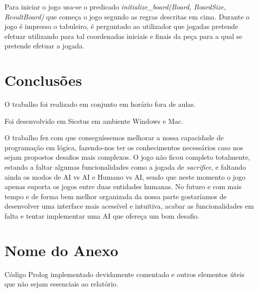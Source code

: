 \documentclass[a4paper]{article}
\begin{document}
Para iniciar o jogo usa-se o predicado \textit{initialize\_board(Board, BoardSize, ResultBoard)} que começa o jogo segundo as
regras descritas em cima. Durante o jogo é impresso o tabuleiro, é perguntado ao utilizador
que jogadas pretende efetuar utilizando para tal coordenadas iniciais e finais da peça para a qual se pretende efetuar a jogada.


\section{Conclusões}

O trabalho foi realizado em conjunto em horário fora de aulas.
\newline

Foi desenvolvido em Sicstus em ambiente Windows e Mac.
\newline

O trabalho fez com que conseguíssemos melhorar a nossa capacidade de
programação em lógica, fazendo-nos ter os conhecimentos necessários caso nos sejam
propostos desafios mais complexos.
O jogo não ficou completo totalmente, estando a faltar algumas funcionalidades
como a jogada de \textit{sacrifice}, e faltando ainda os modos de AI vs AI e Humano vs AI, sendo que
neste momento o jogo apenas suporta os jogos entre duas entidades humanas. No futuro e
com mais tempo e de forma bem melhor organizada da nossa parte gostaríamos de desenvolver uma interface mais acessível e intuitiva,
acabar as funcionalidades em falta e tentar implementar uma AI que ofereça um bom
desafio.


\clearpage
{}
\renewcommand\refname{Bibliografia}



\newpage
\appendix
\section{Nome do Anexo}
Código Prolog implementado devidamente comentado e outros elementos úteis que não sejam essenciais ao relatório.\newline
	
\end{document}
